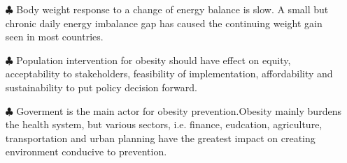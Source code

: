 \documentclass{article}
\begin{document}
\begin{itemize}
\begin{description}
\begin{itemize}
					\item[$\clubsuit$] Body weight response to a change of energy balance is slow. A small but chronic daily energy imbalance gap has caused the continuing weight gain seen in most countries.
					\item[$\clubsuit$] Population intervention for obesity should have effect on equity, acceptability to stakeholders, feasibility of implementation, affordability and sustainability to put policy decision forward. 
					\item[$\clubsuit$] Goverment is the main actor for obesity prevention.Obesity mainly burdens the health system, but various sectors, i.e. finance, eudcation, agriculture, transportation and urban planning have the greatest impact on creating environment conducive to prevention. 
				\end{itemize} 
		\end{description}


\end{itemize}
\end{document}

